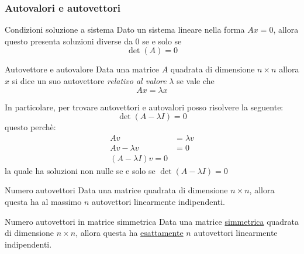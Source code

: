 \subsubsection{Autovalori e autovettori}
\begin{teorema}{Condizioni soluzione a sistema}
	Dato un sistema lineare nella forma $ Ax = 0 $, allora questo presenta soluzioni diverse da 0 se e solo se
	\[
		\operatorname{det}\left(A\right) = 0
	\]
\end{teorema}

\begin{definizione}{Autovettore e autovalore}
	Data una matrice $ A $ quadrata di dimensione $ n \times n $ allora $ x $ si dice un suo autovettore \textit{relativo al valore} $ \lambda  $ se vale che
	\[
		Ax = \lambda x
	\]
\end{definizione}
In particolare, per trovare autovettori e autovalori posso risolvere la seguente:
\[
	\operatorname{det}\left(A - \lambda I\right) = 0
\]
questo perchè:
\begin{align*}
	Av            & = \lambda v \\
	Av -\lambda v & = 0         \\
	\left(A - \lambda I \right) v = 0
\end{align*}
la quale ha soluzioni non nulle se e solo se $ \operatorname{det}\left(A - \lambda I\right) = 0 $
\begin{teorema}{Numero autovettori}
	Data una matrice quadrata di dimensione $ n \times n $, allora questa ha al massimo $ n $ autovettori linearmente indipendenti.
\end{teorema}

\begin{teorema}{Numero autovettori in matrice simmetrica}
	Data una matrice \underline{simmetrica} quadrata di dimensione $ n \times n $, allora questa ha \underline{esattamente} $ n $ autovettori linearmente indipendenti.
\end{teorema}

